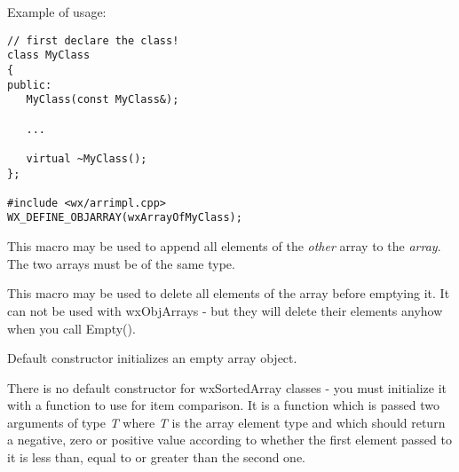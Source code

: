 Example of usage:

\begin{verbatim}
// first declare the class!
class MyClass
{
public:
   MyClass(const MyClass&);

   ...

   virtual ~MyClass();
};

#include <wx/arrimpl.cpp>
WX_DEFINE_OBJARRAY(wxArrayOfMyClass);
\end{verbatim}

\label{wxappendarray}


This macro may be used to append all elements of the {\it other} array to the 
{\it array}. The two arrays must be of the same type.

\label{wxcleararray}


This macro may be used to delete all elements of the array before emptying it.
It can not be used with wxObjArrays - but they will delete their elements anyhow
when you call Empty().

\label{wxarrayctordef}



Default constructor initializes an empty array object.


There is no default constructor for wxSortedArray classes - you must initialize it
with a function to use for item comparison. It is a function which is passed
two arguments of type {\it T} where {\it T} is the array element type and which
should return a negative, zero or positive value according to whether the first
element passed to it is less than, equal to or greater than the second one.

\label{wxarrayctorcopy}




